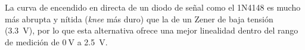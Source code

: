 \documentclass[11pt, a4paper]{article}
\begin{document}
La curva de encendido en directa de un diodo de señal como el 1N4148 es mucho más abrupta y nítida (\textit{knee} más duro) que la de un Zener de baja tensión (\qty{3.3}{\volt}), por lo que esta alternativa ofrece una mejor linealidad dentro del rango de medición de $\qty{0}{\volt}$ a \qty{2.5}{\volt}.

\vspace{0.5cm}
\end{document}
